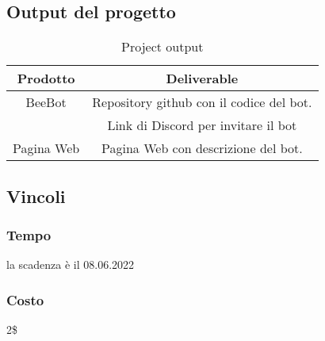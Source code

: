 \newpage 
\subsection{Output del progetto}
\begin{table}[!h]
    \begin{center}
    \begin{tabular}{ |c|c| } 
     \hline
     \textbf{Prodotto} & \textbf{Deliverable}  \\ [0.5ex] 
     \hline\hline
     BeeBot & Repository github con il codice del bot.\\
            & Link di Discord per invitare il bot\\
    \hline
     Pagina Web & Pagina Web con descrizione del bot.\\
      \hline
    \end{tabular}
    \end{center}
    \caption{Project output}
    \label{req}
\end{table}


\subsection{Vincoli}
\subsubsection{Tempo}
la scadenza è il 08.06.2022
\subsubsection{Costo}
2\$

